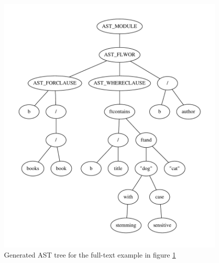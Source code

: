 \begin{figure}[h!]

\caption{Full-text XQuery expression used to generate the AST in figure
\ref{tree:ast:ftq1}}
\label{code:xq:ftq1}
\centering
 \includegraphics[scale=0.6]{img/graphs/ftq1}
\caption{Generated AST tree for the full-text example in figure \ref{tree:ast:ftq1}}
\label{tree:ast:ftq1}
\end{figure}